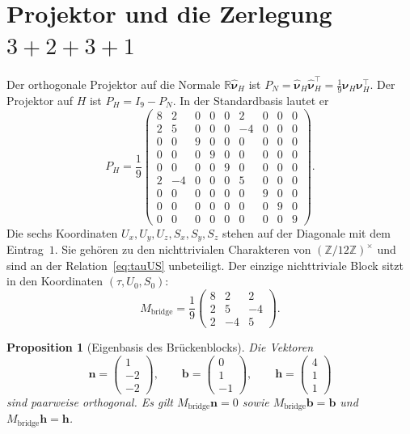 \documentclass[11pt,a4paper]{article}
\theoremstyle{plain}
\newtheorem{proposition}[theorem]{Proposition}
\theoremstyle{definition}
\newcommand{\Z}{\mathbb{Z}}
\newcommand{\R}{\mathbb{R}}
\numberwithin{equation}{section}
\begin{document}
\section{Projektor und die Zerlegung \texorpdfstring{$3+2+3+1$}{3+2+3+1}}

Der orthogonale Projektor auf die Normale $\R\widehat{\boldsymbol{\nu}}_H$ ist
$P_N=\widehat{\boldsymbol{\nu}}_H\widehat{\boldsymbol{\nu}}_H^\top
=\frac19\boldsymbol{\nu}_H\boldsymbol{\nu}_H^\top$.
Der Projektor auf $H$ ist $P_H=I_9-P_N$.
In der Standardbasis lautet er
\begin{equation}
P_H=\frac19
\begin{pmatrix}
8&2&0&0&0&2&0&0&0\\
2&5&0&0&0&-4&0&0&0\\
0&0&9&0&0&0&0&0&0\\
0&0&0&9&0&0&0&0&0\\
0&0&0&0&9&0&0&0&0\\
2&-4&0&0&0&5&0&0&0\\
0&0&0&0&0&0&9&0&0\\
0&0&0&0&0&0&0&9&0\\
0&0&0&0&0&0&0&0&9
\end{pmatrix}.
\end{equation}
Die sechs Koordinaten $U_x,U_y,U_z,S_x,S_y,S_z$ stehen auf der Diagonale
mit dem Eintrag~$1$.
Sie gehören zu den nichttrivialen Charakteren von $(\Z/12\Z)^\times$ und sind
an der Relation~\eqref{eq:tauUS} unbeteiligt.
Der einzige nichttriviale Block sitzt in den Koordinaten $(\tau,U_0,S_0)$:
\begin{equation}
M_{\mathrm{bridge}}=\frac19
\begin{pmatrix}
8&2&2\\
2&5&-4\\
2&-4&5
\end{pmatrix}.
\end{equation}

\begin{proposition}[Eigenbasis des Brückenblocks]
Die Vektoren
\begin{equation}
\mathbf{n}=\begin{pmatrix}1\\-2\\-2\end{pmatrix},
\qquad
\mathbf{b}=\begin{pmatrix}0\\1\\-1\end{pmatrix},
\qquad
\mathbf{h}=\begin{pmatrix}4\\1\\1\end{pmatrix}
\end{equation}
sind paarweise orthogonal.
Es gilt $M_{\mathrm{bridge}}\mathbf{n}=0$ sowie
$M_{\mathrm{bridge}}\mathbf{b}=\mathbf{b}$ und
$M_{\mathrm{bridge}}\mathbf{h}=\mathbf{h}$.
\end{proposition}
\end{document}
